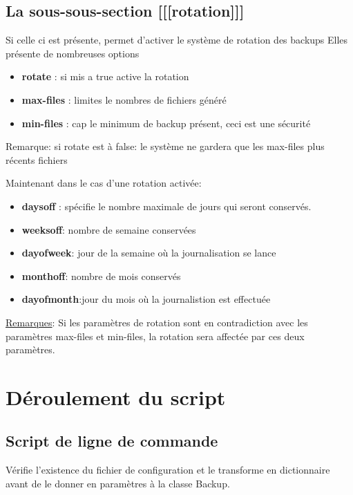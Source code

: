 \subsection*{La sous-sous-section [[[rotation]]]}
Si celle ci est présente, permet d'activer le système de rotation des backups
Elles présente de nombreuses options
\begin{itemize}
\item \textbf{rotate} : si mis a true active la rotation
\item \textbf{max-files} : limites le nombres de fichiers généré
\item \textbf{min-files} : cap le minimum de backup présent, ceci est une sécurité
\end{itemize}
Remarque: si rotate est à false: le système ne gardera que les max-files plus récents fichiers

Maintenant dans le cas d'une rotation activée:
\begin{itemize}
\item \textbf{daysoff} : spécifie le nombre maximale de jours qui seront conservés.
\item \textbf{weeksoff}: nombre de semaine conservées
\item \textbf{dayofweek}: jour de la semaine où la journalisation se lance
\item \textbf{monthoff}: nombre de mois conservés
\item \textbf{dayofmonth}:jour du mois où la journalistion est effectuée	
\end{itemize}

\underline{Remarques}:
	Si les paramètres de rotation sont en contradiction avec les paramètres max-files et min-files,
la rotation sera affectée par ces deux paramètres. 


\section*{Déroulement du script}
\subsection*{Script de ligne de commande}
Vérifie l'existence du fichier de configuration et le transforme en dictionnaire avant de le donner en paramètres à la classe Backup.

